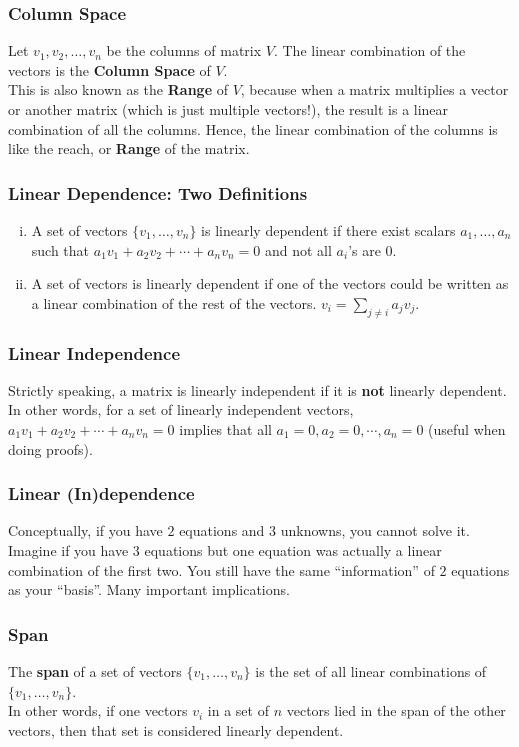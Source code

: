 \documentclass{beamer}
\begin{document}
\begin{frame}[t]\vspace{10pt}
\frametitle{Column Space}
Let $v_1, v_2, \dots, v_n$ be the columns of matrix $V$. The linear combination of the vectors is the \textbf{Column Space} of $V$. \\
This is also known as the \textbf{Range} of $V$, because when a matrix multiplies a vector or another matrix (which is just multiple vectors!), the result is a linear combination of all the columns. Hence, the linear combination of the columns is like the reach, or \textbf{Range} of the matrix.
\end{frame}

\begin{frame}[t]\vspace{10pt}
\frametitle{Linear Dependence: Two Definitions}
\begin{enumerate}[(i)]
\item A set of vectors $\{ v_1, \ldots, v_n \}$ is linearly dependent if there exist scalars $a_1, \ldots, a_n$ such that $a_1 v_1 + a_2 v_2 + \cdots + a_n v_n = 0$ and not all $a_i$'s are $0$.
\item A set of vectors is linearly dependent if one of the vectors could be written as a linear combination of the rest of the vectors. $v_i = \sum_{j \neq i} a_j v_j$.
\end{enumerate}
\end{frame}

\begin{frame}[t]\vspace{10pt}
\frametitle{Linear Independence}
Strictly speaking, a matrix is linearly independent if it is \textbf{not} linearly dependent.\\
In other words, for a set of linearly independent vectors, $a_1 v_1 + a_2 v_2 + \cdots + a_n v_n = 0$ implies that all $a_1 = 0, a_2 = 0, \cdots , a_n = 0$ (useful when doing proofs).
\end{frame}

\begin{frame}[t]\vspace{10pt}
\frametitle{Linear (In)dependence}
Conceptually, if you have $2$ equations and $3$ unknowns, you cannot solve it. Imagine if you have $3$ equations but one equation was actually a linear combination of the first two. You still have the same ``information'' of $2$ equations as your ``basis''. Many important implications.
\end{frame}

\begin{frame}[t]\vspace{10pt}
\frametitle{Span}
The \textbf{span} of a set of vectors $\{v_1, \ldots, v_n\}$ is the set of all linear combinations of $\{v_1, \ldots, v_n\}$.\\
In other words, if one vectors $v_i$ in a set of $n$ vectors lied in the span of the other vectors, then that set is considered linearly dependent.
\end{frame}
\end{document}
